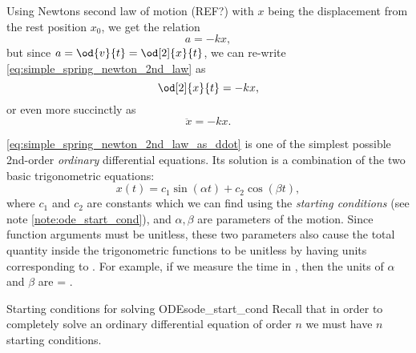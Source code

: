 Using Newtons second law of motion (REF?) with $x$ being the displacement from the rest position $x_{0}$, we get the relation
\begin{equation}
  a = -kx,
  \label{eq:simple_spring_newton_2nd_law}
\end{equation}
but since $a = \od{v}{t} = \od[2]{x}{t}$, we can re-write \autoref{eq:simple_spring_newton_2nd_law} as
\begin{equation}
  \od[2]{x}{t} = -kx,
  \label{eq:simple_spring_newton_2nd_law_as_derivative}
\end{equation}
or even more succinctly as
\begin{equation}
  \ddot{x} = -kx.
  \label{eq:simple_spring_newton_2nd_law_as_ddot}
\end{equation}

\autoref{eq:simple_spring_newton_2nd_law_as_ddot} is one of the simplest possible 2nd-order \textit{ordinary} differential equations. Its solution is a combination of the two basic trigonometric equations:
\begin{equation}
  x(t) = c_{1}\sin(\alpha t) + c_{2}\cos(\beta t),
  \label{eq:harmonic_solution_ode}
\end{equation}
where $c_{1}$ and $c_{2}$ are constants which we can find using the \textit{starting conditions} (see note \autoref{note:ode_start_cond}), and $\alpha,\beta$ are parameters of the motion. Since function arguments must be unitless, these two parameters also cause the total quantity inside the trigonometric functions to be unitless by having units corresponding to . For example, if we measure the time in \SIe{\second}, then the units of $\alpha$ and $\beta$ are \SIe{\per\second} = \SIe{\hertz}.

\begin{note}{Starting conditions for solving ODEs}{ode_start_cond}
  Recall that in order to completely solve an ordinary differential equation of order $n$ we must have $n$ starting conditions.
\end{note}
